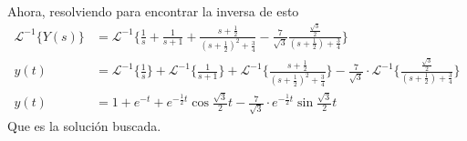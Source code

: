 \documentclass{article}
\begin{document}
\begin{enumerate}
{            Ahora, resolviendo para encontrar la inversa de esto
            \begin{align*}
                \mathcal{L}^{-1}\{Y(s)\} 
                &= \mathcal{L}^{-1}\{
                    \frac{1}{s} + \frac{1}{s+1}
                    + \frac{s+\frac{1}{2}}{(s+\frac{1}{2})^2+\frac{3}{4}}
                    - \frac{7}{\sqrt{3}}\frac{\frac{\sqrt{3}}{2}}{(s+\frac{1}{2})+\frac{3}{4}}
                \} \\
                y(t) &= \mathcal{L}^{-1}\{\frac{1}{s}\} 
                    + \mathcal{L}^{-1}\{\frac{1}{s+1}\}
                    + \mathcal{L}^{-1}\{\frac{s+\frac{1}{2}}{(s+\frac{1}{2})^2+\frac{3}{4}}\} 
                    - \frac{7}{\sqrt{3}} \cdot \mathcal{L}^{-1}\{\frac{\frac{\sqrt{3}}{2}}{(s+\frac{1}{2})+\frac{3}{4}}\}
                    \\
                y(t) &= 1 + e^{-t} + e^{-\frac{1}{2}t}\cos{\frac{\sqrt{3}}{2}t}
                    - \frac{7}{\sqrt{3}}\cdot e^{-\frac{1}{2}t}\sin{\frac{\sqrt{3}}{2}t}
            \end{align*}
            Que es la solución buscada.
        }
    \end{enumerate}
\end{document}
